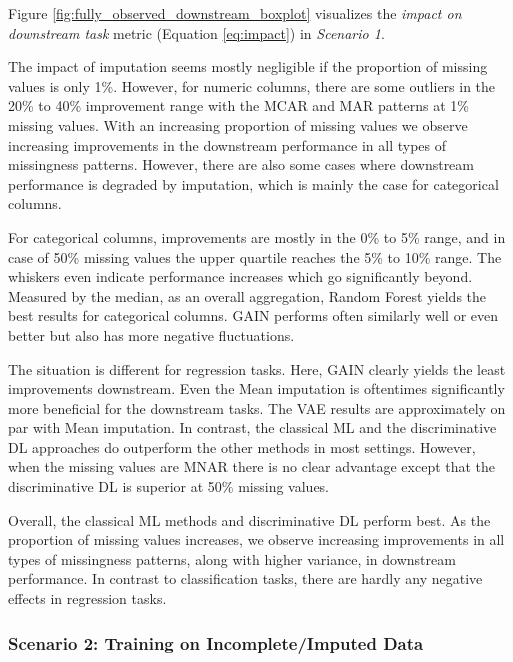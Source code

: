 Figure \ref{fig:fully_observed_downstream_boxplot} visualizes the \textit{impact on downstream task} metric (Equation \ref{eq:impact}) in \textit{Scenario 1}. 

The impact of imputation seems mostly negligible if the proportion of missing values is only 1\%. However, for numeric columns, there are some outliers in the 20\% to 40\% improvement range with the MCAR and MAR patterns at 1\% missing values. With an increasing proportion of missing values we observe increasing improvements in the downstream performance in all types of missingness patterns. However, there are also some cases where downstream performance is degraded by imputation, which is mainly the case for categorical columns.

For categorical columns, improvements are mostly in the 0\% to 5\% range, and in case of 50\% missing values the upper quartile reaches the 5\% to 10\% range. The whiskers even indicate performance increases which go significantly beyond. Measured by the median, as an overall aggregation, Random Forest yields the best results for categorical columns. GAIN performs often similarly well or even better but also has more negative fluctuations.

The situation is different for regression tasks. Here, GAIN clearly yields the least improvements downstream. Even the Mean imputation is oftentimes significantly more beneficial for the downstream tasks. The VAE results are approximately on par with Mean imputation. In contrast, the classical ML and the discriminative DL approaches do outperform the other methods in most settings. However, when the missing values are MNAR there is no clear advantage except that the discriminative DL is superior at 50\% missing values.

Overall, the classical ML methods and discriminative DL perform best. As the proportion of missing values increases, we observe increasing improvements in all types of missingness patterns, along with higher variance, in downstream performance. In contrast to classification tasks, there are hardly any negative effects in regression tasks.

\subsubsection{Scenario 2: Training on Incomplete/Imputed Data}



